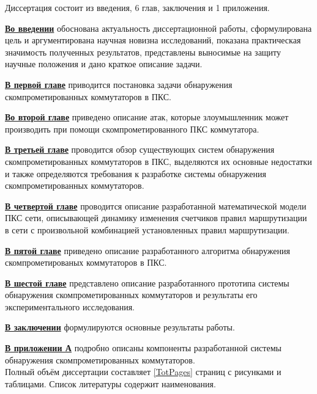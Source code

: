 \documentclass[../thesis.tex]{subfiles}
\begin{document}
{
\hypersetup{linkcolor=black}
Диссертация состоит из введения, 6 глав, заключения и 1 приложения.

\hyperref[chapter:intro]{\textbf{Во введении}} обоснована актуальность диссертационной работы, сформулирована цель и аргументирована научная новизна исследований, показана практическая значимость полученных результатов, представлены выносимые на защиту научные положения и дано краткое описание задачи.

\hyperref[chapter:problem]{\textbf{В первой главе}} приводится постановка задачи обнаружения скомпрометированных коммутаторов в ПКС.

\hyperref[chapter:classification]{\textbf{Во второй главе}} приведено описание атак, которые злоумышленник может производить при помощи скомпрометированного ПКС коммутатора.

\hyperref[chapter:survey]{\textbf{В третьей главе}} проводится обзор существующих систем обнаружения скомпрометированных коммутаторов в ПКС, выделяются их основные недостатки и также определяются требования к разработке системы обнаружения скомпрометированных коммутаторов.

\hyperref[chapter:model]{\textbf{В четвертой главе}} проводится описание разработанной математической модели ПКС сети, описывающей динамику изменения счетчиков правил маршрутизации в сети с произвольной комбинацией установленных правил маршрутизации.

\hyperref[chapter:algorithm]{\textbf{В пятой главе}} приведено описание разработанного алгоритма обнаружения скомпрометированых коммутаторов в ПКС.

\hyperref[chapter:implementation]{\textbf{В шестой главе}} представлено описание разработанного прототипа системы обнаружения скомпрометированных коммутаторов и результаты его экспериментального исследования.

\hyperref[chapter:conclusion]{\textbf{В заключении}} формулируются основные результаты работы.

\hyperref[chapter:appendix]{\textbf{В приложении А}} подробно описаны компоненты разработанной системы обнаружения скомпрометированных коммутаторов.
\\

Полный объём диссертации составляет \ref{TotPages} страниц с  рисунками и\linebreak {} таблицами.
Список литературы содержит  наименования.
}
\end{document}
